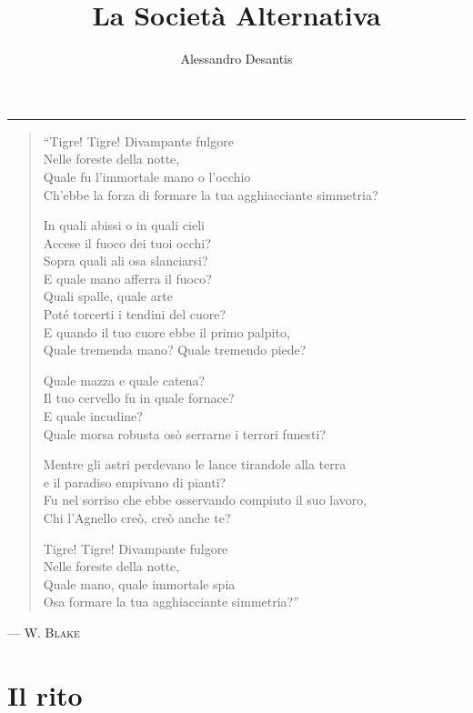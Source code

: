 \documentclass[a4paper,11pt,oneside,openright,final]{memoir}
\title{La Società Alternativa}
\author{Alessandro Desantis}
\makeatletter
\renewcommand{\maketitle}{\begin{titlingpage}%
    \let\footnotesize\small
    \let\footnoterule\relax
    \parindent \z@
    \reset@font
    \null\vfil
    \begin{flushleft}
      \huge \@title
    \end{flushleft}
    \par
    \hrule height 1pt
    \par
    \begin{flushright}
      \LARGE \@author \par
    \end{flushright}
    \vskip 60\p@
    \vfil\null
  \end{titlingpage}%
  \setcounter{footnote}{0}%
}
\makeatother
\begin{document}
\maketitle

\clearpage
\thispagestyle{empty}

\begin{verse}
\itshape{
``Tigre! Tigre! Divampante fulgore\\
Nelle foreste della notte,\\
Quale fu l'immortale mano o l'occhio\\
Ch'ebbe la forza di formare la tua agghiacciante simmetria?

In quali abissi o in quali cieli\\
Accese il fuoco dei tuoi occhi?\\
Sopra quali ali osa slanciarsi?\\
E quale mano afferra il fuoco?\\
Quali spalle, quale arte\\
Poté torcerti i tendini del cuore?\\
E quando il tuo cuore ebbe il primo palpito,\\
Quale tremenda mano? Quale tremendo piede?

Quale mazza e quale catena?\\
Il tuo cervello fu in quale fornace?\\
E quale incudine?\\
Quale morsa robusta osò serrarne i terrori funesti?

Mentre gli astri perdevano le lance tirandole alla terra\\
e il paradiso empivano di pianti?\\
Fu nel sorriso che ebbe osservando compiuto il suo lavoro,\\
Chi l'Agnello creò, creò anche te?

Tigre! Tigre! Divampante fulgore\\
Nelle foreste della notte,\\
Quale mano, quale immortale spia\\
Osa formare la tua agghiacciante simmetria?''
\/}
\end{verse}

\begin{flushright}
--- \scshape{W. Blake}
\end{flushright}

\chapter{Il rito}
\end{document}
